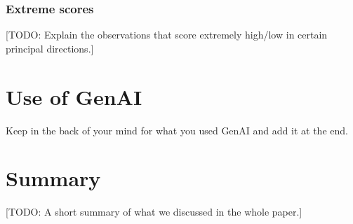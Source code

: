 \documentclass[dtu]{dtuarticle}
\newcommand{\todo}[1]{\color{red}[TODO: #1]\color{black}}
\begin{document}
	\subsubsection{Extreme scores}

	\todo{Explain the observations that score extremely high/low in certain principal directions.}

	\section{Use of GenAI}

	Keep in the back of your mind for what you used GenAI and add it at the end.

	\section*{Summary}

	\todo{A short summary of what we discussed in the whole paper.}

	
	

%
%

\end{document}
